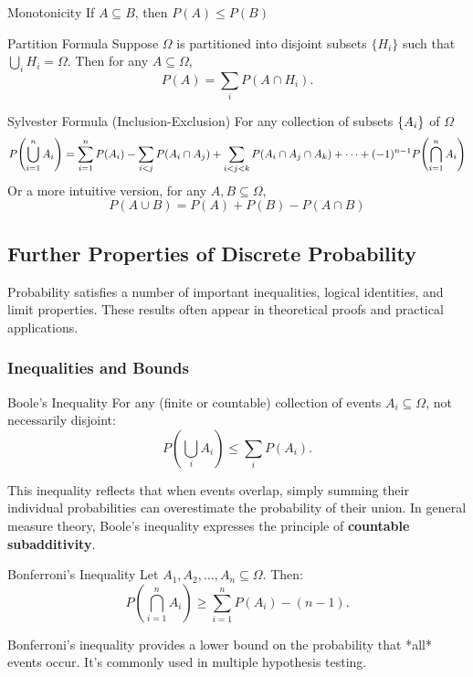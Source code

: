 \begin{cor}{Monotonicity} If $A \subseteq B$, then $P(A) \leq P(B)$
\end{cor}

\begin{cor}{Partition Formula}
Suppose $\Omega$ is partitioned into disjoint subsets $\{H_i\}$ such that $\bigcup_i H_i = \Omega$. Then for any $A \subseteq \Omega$,
\[
P(A) = \sum_i P(A \cap H_i).
\]
\end{cor}


\begin{cor}{Sylvester Formula (Inclusion-Exclusion)}
For any collection of subsets $\qty{A_i}$ of $\Omega$
$$P\qty(\bigcup_{i=1}^n A_i) = \sum_{i=1}^nP(A_i) - \sum_{i<j}P(A_i\cap A_j) + \sum_{i<j<k}P(A_i\cap A_j\cap A_k) + \dots + (-1)^{n-1}P\qty(\bigcap_{i=1}^nA_i)$$
Or a more intuitive version, for any $A, B\subseteq \Omega$, 
$$P(A\cup B) = P(A)+P(B)-P(A\cap B)$$
\end{cor}


\subsection{Further Properties of Discrete Probability}
Probability satisfies a number of important inequalities, logical identities, and limit properties. These results often appear in theoretical proofs and practical applications.

\subsubsection{Inequalities and Bounds}

\begin{prop}{Boole's Inequality}
For any (finite or countable) collection of events \( A_i \subseteq \Omega \), not necessarily disjoint:
\[
P\left(\bigcup_i A_i\right) \leq \sum_i P(A_i).
\]
\end{prop}

\begin{rmk}
This inequality reflects that when events overlap, simply summing their individual probabilities can overestimate the probability of their union. In general measure theory, Boole’s inequality expresses the principle of \textbf{countable subadditivity}.
\end{rmk}


\begin{prop}{Bonferroni's Inequality}
Let \( A_1, A_2, \dots, A_n \subseteq \Omega \). Then:
\[
P\left(\bigcap_{i=1}^n A_i\right) \geq \sum_{i=1}^n P(A_i) - (n - 1).
\]
\end{prop}
\begin{rmk}
Bonferroni’s inequality provides a lower bound on the probability that *all* events occur. It’s commonly used in multiple hypothesis testing.
\end{rmk}



